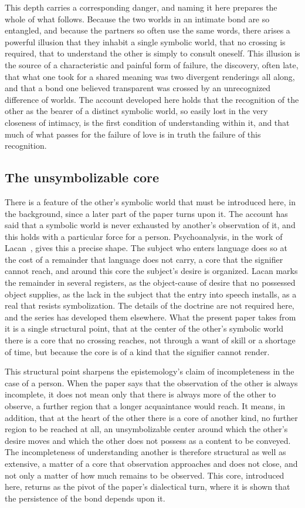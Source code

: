 This depth carries a corresponding danger, and naming it here prepares the whole of what follows. Because the two worlds in an intimate bond are so entangled, and because the partners so often use the same words, there arises a powerful illusion that they inhabit a single symbolic world, that no crossing is required, that to understand the other is simply to consult oneself. This illusion is the source of a characteristic and painful form of failure, the discovery, often late, that what one took for a shared meaning was two divergent renderings all along, and that a bond one believed transparent was crossed by an unrecognized difference of worlds. The account developed here holds that the recognition of the other as the bearer of a distinct symbolic world, so easily lost in the very closeness of intimacy, is the first condition of understanding within it, and that much of what passes for the failure of love is in truth the failure of this recognition.

\subsection*{The unsymbolizable core}

There is a feature of the other's symbolic world that must be introduced here, in the background, since a later part of the paper turns upon it. The account has said that a symbolic world is never exhausted by another's observation of it, and this holds with a particular force for a person. Psychoanalysis, in the work of Lacan~\parencite{lacan1977xi,lacan1992vii}, gives this a precise shape. The subject who enters language does so at the cost of a remainder that language does not carry, a core that the signifier cannot reach, and around this core the subject's desire is organized. Lacan marks the remainder in several registers, as the object-cause of desire that no possessed object supplies, as the lack in the subject that the entry into speech installs, as a real that resists symbolization. The details of the doctrine are not required here, and the series has developed them elsewhere. What the present paper takes from it is a single structural point, that at the center of the other's symbolic world there is a core that no crossing reaches, not through a want of skill or a shortage of time, but because the core is of a kind that the signifier cannot render.

This structural point sharpens the epistemology's claim of incompleteness in the case of a person. When the paper says that the observation of the other is always incomplete, it does not mean only that there is always more of the other to observe, a further region that a longer acquaintance would reach. It means, in addition, that at the heart of the other there is a core of another kind, no further region to be reached at all, an unsymbolizable center around which the other's desire moves and which the other does not possess as a content to be conveyed. The incompleteness of understanding another is therefore structural as well as extensive, a matter of a core that observation approaches and does not close, and not only a matter of how much remains to be observed. This core, introduced here, returns as the pivot of the paper's dialectical turn, where it is shown that the persistence of the bond depends upon it.
